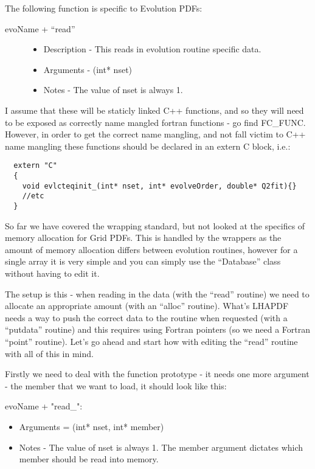 The following function is specific to Evolution PDFs:
    
\begin{description}
  \item[ evoName + ``read'' ] \hfill

    \begin{itemize}
      \item Description - This reads in evolution routine specific data.
      \item Arguments - (int* nset)
      \item Notes - The value of nset is always 1.
    \end{itemize}
\end{description}

I assume that these will be staticly linked C++ functions, and so they will 
need to be exposed as correctly name mangled fortran functions - go find 
FC\_FUNC. However, in order to get the correct name mangling, and not fall 
victim to C++ name mangling these functions should be declared in an extern
C block, i.e.:

\begin{verbatim}
  extern "C"
  {
    void evlcteqinit_(int* nset, int* evolveOrder, double* Q2fit){}
    //etc
  }
\end{verbatim}

So far we have covered the wrapping standard, but not looked at the 
specifics of memory allocation for Grid PDFs. This is handled by the
wrappers as the amount of memory allocation differs between evolution 
routines, however for a single array it is very simple and you can simply
use the ``Database'' class without having to edit it.

The setup is this - when reading in the data (with the ``read'' routine) we
need to allocate an appropriate amount (with an ``alloc'' routine). What's
LHAPDF needs a way to push the correct data to the routine when requested
(with a ``putdata'' routine) and this requires using Fortran pointers (so we
need a Fortran ``point'' routine). Let's go ahead and start how with editing
the ``read'' routine with all of this in mind.

Firstly we need to deal with the function prototype - it needs one more
argument - the member that we want to load, it should look like this:

evoName + "read\_":

  \begin{itemize}
    \item Arguments = (int* nset, int* member)
    \item Notes - The value of nset is always 1. The member argument 
          dictates which member should be read into memory.
  \end{itemize}

